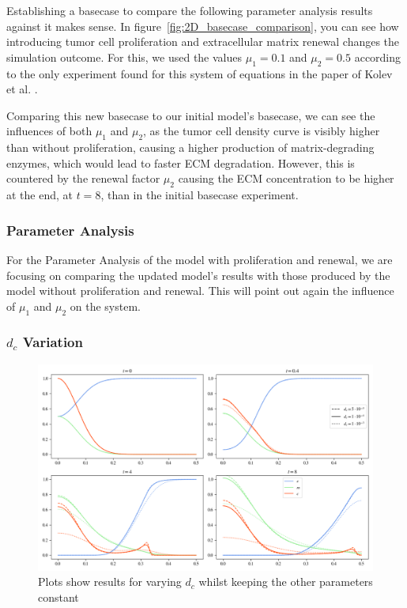 Establishing a basecase to compare the following parameter analysis results against it makes sense. In figure~\ref{fig:2D_basecase_comparison}, you can see how introducing tumor cell proliferation and extracellular matrix renewal changes the simulation outcome. For this, we used the values $\mu_1= 0.1$ and $\mu_2=0.5$ according to the only experiment found for this system of equations in the paper of Kolev et al. \cite{Kolev2010}.

Comparing this new basecase to our initial model's basecase, we can see the influences of both $\mu_1$ and $\mu_2$, as the tumor cell density curve is visibly higher than without proliferation, causing a higher production of matrix-degrading enzymes, which would lead to faster ECM degradation. However, this is countered by the renewal factor $\mu_2$ causing the ECM concentration to be higher at the end, at $t=8$, than in the initial basecase experiment.





\subsubsection{Parameter Analysis}

For the Parameter Analysis of the model with proliferation and renewal, we are focusing on comparing the updated model's results with those produced by the model without proliferation and renewal. This will point out again the influence of $\mu_1$ and $\mu_2$ on the system.

\subsubsection*{$d_c$ Variation}
\begin{figure}[h]
    \centering
    \includegraphics[width=\textwidth]{resources/images/prolif_dc_variation.png}
    \caption{Plots show results for varying $d_c$ whilst keeping the other parameters constant}
    \label{fig:prolif_dc_comparison}
\end{figure}

